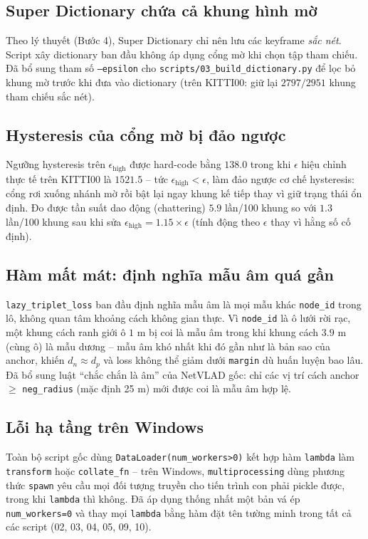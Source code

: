 \documentclass[a4paper,12pt]{article}
\begin{document}
\subsection{Super Dictionary chứa cả khung hình mờ}
Theo lý thuyết (Bước 4), Super Dictionary chỉ nên lưu các keyframe \emph{sắc nét}. Script xây dictionary ban đầu không áp dụng cổng mờ khi chọn tập tham chiếu. Đã bổ sung tham số \texttt{--epsilon} cho \texttt{scripts/03\_build\_dictionary.py} để lọc bỏ khung mờ trước khi đưa vào dictionary (trên KITTI00: giữ lại $2797/2951$ khung tham chiếu sắc nét).

\subsection{Hysteresis của cổng mờ bị đảo ngược}
Ngưỡng hysteresis trên $\epsilon_{\text{high}}$ được hard-code bằng $138.0$ trong khi $\epsilon$ hiệu chỉnh thực tế trên KITTI00 là $1521.5$ -- tức $\epsilon_{\text{high}} < \epsilon$, làm đảo ngược cơ chế hysteresis: cổng rơi xuống nhánh mờ rồi bật lại ngay khung kế tiếp thay vì giữ trạng thái ổn định. Đo được tần suất dao động (chattering) $5.9$ lần/100 khung so với $1.3$ lần/100 khung sau khi sửa $\epsilon_{\text{high}} = 1.15\times\epsilon$ (tính động theo $\epsilon$ thay vì hằng số cố định).

\subsection{Hàm mất mát: định nghĩa mẫu âm quá gần}
\texttt{lazy\_triplet\_loss} ban đầu định nghĩa mẫu âm là mọi mẫu khác \texttt{node\_id} trong lô, không quan tâm khoảng cách không gian thực. Vì \texttt{node\_id} là ô lưới rời rạc, một khung cách ranh giới ô $1$ m bị coi là mẫu âm trong khi khung cách $3.9$ m (cùng ô) là mẫu dương -- mẫu âm khó nhất khi đó gần như là bản sao của anchor, khiến $d_n \approx d_p$ và loss không thể giảm dưới \texttt{margin} dù huấn luyện bao lâu. Đã bổ sung luật ``chắc chắn là âm'' của NetVLAD gốc: chỉ các vị trí cách anchor $\ge$ \texttt{neg\_radius} (mặc định 25 m) mới được coi là mẫu âm hợp lệ.

\subsection{Lỗi hạ tầng trên Windows}
Toàn bộ script gốc dùng \texttt{DataLoader(num\_workers>0)} kết hợp hàm \texttt{lambda} làm \texttt{transform} hoặc \texttt{collate\_fn} -- trên Windows, \texttt{multiprocessing} dùng phương thức \texttt{spawn} yêu cầu mọi đối tượng truyền cho tiến trình con phải pickle được, trong khi \texttt{lambda} thì không. Đã áp dụng thống nhất một bản vá ép \texttt{num\_workers=0} và thay mọi \texttt{lambda} bằng hàm đặt tên tường minh trong tất cả các script (02, 03, 04, 05, 09, 10).
\end{document}
